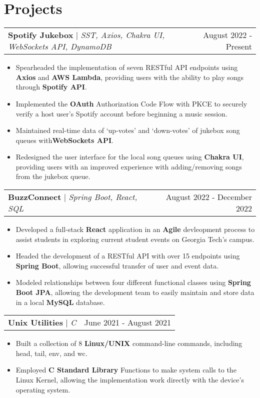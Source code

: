 \documentclass[letterpaper,11pt]{article}
\makeatletter
\newcommand{\resumeProjectHeading}[3]{
    \begin{tabular*}{0.97\textwidth}[t]{l@{\extracolsep{\fill}}r}
      \textbf{#1} $\vert$ \textit{#2}  & {#3}
    \end{tabular*}\vspace{-3pt}
}
\newcommand{\resumeItemListStart}{\begin{itemize}[noitemsep]\vspace{-4pt}}
\newcommand{\resumeItemListEnd}{\end{itemize}}
\makeatother
\begin{document}
\section{Projects}
    \resumeProjectHeading{Spotify Jukebox}{SST, Axios, Chakra UI, WebSockets API, DynamoDB}{August 2022 - Present}
      \resumeItemListStart
        \item {Spearheaded the implementation of seven RESTful API endpoints using \textbf{Axios} and \textbf{AWS Lambda}, providing users with the ability to play songs through \textbf{Spotify API}.}
        \item {Implemented the \textbf{OAuth} Authorization Code Flow with PKCE to securely verify a host user's Spotify account before beginning a music session.}
        \item {Maintained real-time data of `up-votes' and `down-votes' of jukebox song queues with\textbf{WebSockets API}.}
        \item {Redesigned the user interface for the local song queues using \textbf{Chakra UI}, providing users with an improved experience with adding/removing songs from the jukebox queue.}
      \resumeItemListEnd

    \resumeProjectHeading{BuzzConnect}{Spring Boot, React, SQL}{August 2022 - December 2022}
      \resumeItemListStart
        \item {Developed a full-stack \textbf{React} application in an \textbf{Agile} devleopment process to assist students in exploring current student events on Georgia Tech's campus.}
        \item {Headed the development of a RESTful API with over 15 endpoints using \textbf{Spring Boot}, allowing successful transfer of user and event data.}
        \item {Modeled relationships between four different functional classes using \textbf{Spring Boot JPA}, allowing the development team to easily maintain and store data in a local \textbf{MySQL} database.}
      \resumeItemListEnd

    \resumeProjectHeading{Unix Utilities}{C}{June 2021 - August 2021}
      \resumeItemListStart
        \item {Built a collection of 8 \textbf{Linux/UNIX} command-line commands, including head, tail, env, and wc.}
        \item {Employed \textbf{C Standard Library} Functions to make system calls to the Linux Kernel, allowing the implementation work directly with the device's operating system.}
      \resumeItemListEnd
\end{document}
